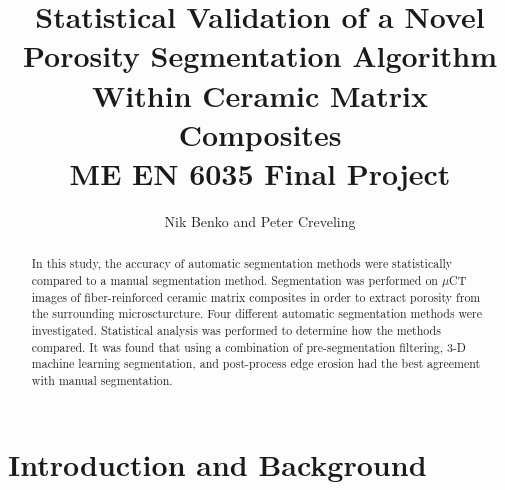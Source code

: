 \documentclass[11pt, twocolumn]{article}
\begin{document}
\title{ Statistical Validation of a Novel Porosity Segmentation Algorithm Within Ceramic Matrix Composites  \\ \normalsize{ME EN 6035 Final Project}}
\author{Nik Benko and Peter Creveling}
\maketitle


\begin{abstract} 
In this study, the accuracy of automatic segmentation methods were statistically compared to a manual segmentation method. Segmentation was performed on $\mu$CT images of fiber-reinforced ceramic matrix composites in order to extract porosity from the surrounding microscturcture. Four different automatic segmentation methods were investigated. Statistical analysis was performed to determine how the methods compared. It was found that using a combination of pre-segmentation filtering, 3-D machine learning segmentation, and post-process edge erosion had the best agreement with manual segmentation.
\end{abstract}

\section{Introduction and Background}
\end{document}
